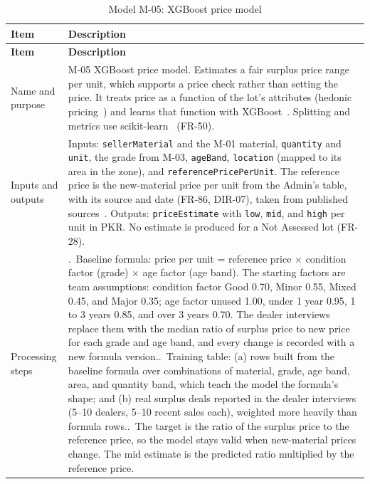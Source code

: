 {\footnotesize
\begin{longtable}{@{}>{\raggedright\arraybackslash}p{}>{\raggedright\arraybackslash}p{}@{}}
\caption{Model M-05: XGBoost price model}\label{tab:m-05}\\
\toprule
\textbf{Item} & \textbf{Description} \\
\midrule
\endfirsthead
\toprule
\textbf{Item} & \textbf{Description} \\
\midrule
\endhead
Name and purpose & M-05 XGBoost price model. Estimates a fair surplus price range per unit, which supports a price check rather than setting the price. It treats price as a function of the lot's attributes (hedonic pricing~\citep{rosen1974hedonic}) and learns that function with XGBoost~\citep{chen2016xgboost}. Splitting and metrics use scikit-learn~\citep{pedregosa2011sklearn} (FR-50). \\
Inputs and outputs & Inputs: \texttt{sellerMaterial} and the M-01 material, \texttt{quantity} and \texttt{unit}, the grade from M-03, \texttt{ageBand}, \texttt{location} (mapped to its area in the zone), and \texttt{referencePricePerUnit}. The reference price is the new-material price per unit from the Admin's table, with its source and date (FR-86, DIR-07), taken from published sources~\citep{iconssteelrate,toolsfluentcost2026,thenewscosts2026,zameenprices,graanaprices}. Outputs: \texttt{priceEstimate} with \texttt{low}, \texttt{mid}, and \texttt{high} per unit in PKR. No estimate is produced for a Not Assessed lot (FR-28). \\
Processing steps & 1.~Baseline formula: price per unit = reference price $\times$ condition factor (grade) $\times$ age factor (age band). The starting factors are team assumptions: condition factor Good 0.70, Minor 0.55, Mixed 0.45, and Major 0.35; age factor unused 1.00, under 1 year 0.95, 1 to 3 years 0.85, and over 3 years 0.70. The dealer interviews replace them with the median ratio of surplus price to new price for each grade and age band, and every change is recorded with a new formula version.\newline
2.~Training table: (a) rows built from the baseline formula over combinations of material, grade, age band, area, and quantity band, which teach the model the formula's shape; and (b) real surplus deals reported in the dealer interviews (5--10 dealers, 5--10 recent sales each), weighted more heavily than formula rows.\newline
3.~The target is the ratio of the surplus price to the reference price, so the model stays valid when new-material prices change. The mid estimate is the predicted ratio multiplied by the reference price.\newline

\end{longtable}}
